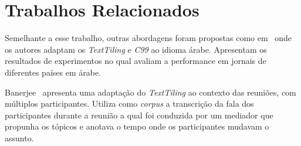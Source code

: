 \section{Trabalhos Relacionados}
	\label{sec:trabalhos}






Semelhante a esse trabalho, outras abordagens foram propostas como em~\cite{CHAIBI2014} onde os autores adaptam os \textit{TextTiling} e \textit{C99} ao idioma árabe. Apresentam os resultados de experimentos no qual avaliam a performance em jornais de diferentes países em árabe. 


Banerjee~\cite{Banerjee2006} apresenta uma adaptação do \textit{TextTiling} ao contexto das reuniões, com múltiplos participantes.           Utiliza como \textit{corpus} a transcrição da fala dos participantes durante a reunião a qual foi conduzida por um mediador que propunha os tópicos e anotava o tempo onde os participantes mudavam o assunto.


